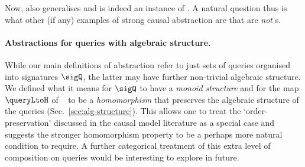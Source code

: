 \documentclass{article}
\begin{document}
Now, \isoCCA{} also generalises \CCA{} and is indeed an instance of \strongCA. A natural question thus is what other (if any) examples of strong causal abstraction are that are \emph{not} \isoCCA{}s. 



\paragraph{Abstractions for queries with algebraic structure.} 
While our main definitions of abstraction refer to just sets of queries organised into signatures $\sigQ$, the latter may have further non-trivial algebraic structure. 
We defined what it means for $\sigQ$ to have a \emph{monoid structure} and for the map $\queryLtoH$ of \ \qup{} to be a \emph{homomorphism} that preserves the algebraic structure of the queries (Sec.~\ref{sec:alg-structure}).  
This allows one to treat the `order-preservation' discussed in the causal model literature as a special case and suggests the stronger homomorphism property to be a perhaps more natural condition to require. 
A further categorical treatment of this extra level of composition on queries would be interesting to explore in future. 
\end{document}
